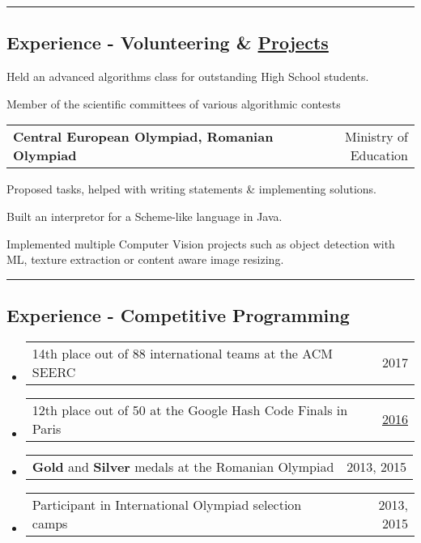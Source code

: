 \documentclass[10pt,letterpaper]{article}
\makeatletter
\newcommand{\headerrow}[2]
{\begin{tabular*}{\linewidth}{l@{\extracolsep{\fill}}r}
	#1 &
	#2 \\
\end{tabular*}}
\makeatother
\begin{document}
\hrule
\vspace{-1em}

\subsection*{Experience - Volunteering \& \href{https://github.com/ericpts}{Projects}}

\vspace{-0.4em}

\begin{itemize*}

	\item Held an advanced algorithms class for outstanding High School students.

	\item
		{Member of the scientific committees of various algorithmic contests}

	\headerrow
		{\textbf{Central European Olympiad, Romanian Olympiad}}
		{Ministry of Education}

\vspace{-0.6em}

	\begin{itemize*}
		\item Proposed tasks, helped with writing statements \& implementing solutions.
	\end{itemize*}

\vspace{-0.6em}

    \item Built an interpretor for a Scheme-like language in Java.
    \item Implemented multiple Computer Vision projects such as object detection with ML, texture extraction or content aware image resizing.
\end{itemize*}



\hrule

\vspace{-1em}

\subsection*{Experience - Competitive Programming}
\begin{itemize}
	\parskip=0.1em
		\item
		\headerrow
			{14th place out of 88 international teams at the ACM SEERC}
			{2017}

		\item
		\headerrow
			{12th place out of 50 at the Google Hash Code Finals in Paris}
            {\href{https://hashcode.withgoogle.com/hashcode_2016.html}{2016}}

        \item
		\headerrow
            {\textbf{Gold} and \textbf{Silver} medals at the Romanian Olympiad}
			{2013, 2015}

        \item
		\headerrow
            {Participant in International Olympiad selection camps}
			{2013, 2015}

\end{itemize}
\end{document}
